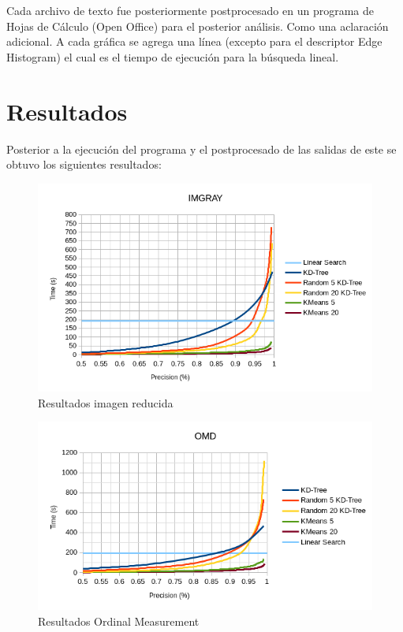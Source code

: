 \documentclass{article}
\begin{document}
	Cada archivo de texto fue posteriormente postprocesado en un programa de Hojas de Cálculo (Open Office) para el posterior análisis. Como una aclaración adicional. A cada gráfica se agrega una línea (excepto para el descriptor Edge Histogram) el cual es el tiempo de ejecución para la búsqueda lineal.
	
	\section{Resultados}
	Posterior a la ejecución del programa y el postprocesado de las salidas de este se obtuvo los siguientes resultados:
	\begin{figure}
		\includegraphics[width=\linewidth]{imgray.png}
		\caption{Resultados imagen reducida}
	\end{figure}
	\begin{figure}
		\includegraphics[width=\linewidth]{omd.png}
		\caption{Resultados Ordinal Measurement}
	\end{figure}
\end{document}
